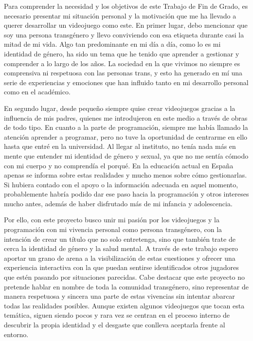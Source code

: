 
Para comprender la necesidad y los objetivos de este Trabajo de Fin de Grado, es necesario presentar mi situación personal y la motivación que me ha llevado a querer desarrollar un videojuego como este. En primer lugar, debo mencionar que soy una persona transgénero y llevo conviviendo con esa etiqueta durante casi la mitad de mi vida. Algo tan predominante en mi día a día, como lo es mi identidad de género, ha sido un tema que he tenido que aprender a gestionar y comprender a lo largo de los años. La sociedad en la que vivimos no siempre es comprensiva ni respetuosa con las personas trans, y esto ha generado en mí una serie de experiencias y emociones que han influido tanto en mi desarrollo personal como en el académico.

En segundo lugar, desde pequeño siempre quise crear videojuegos gracias a la influencia de mis padres, quienes me introdujeron en este medio a través de obras de todo tipo. En cuanto a la parte de programación, siempre me había llamado la atención aprender a programar, pero no tuve la oportunidad de centrarme en ello hasta que entré en la universidad. Al llegar al instituto, no tenía nada más en mente que entender mi identidad de género y sexual, ya que no me sentía cómodo con mi cuerpo y no comprendía el porqué. En la educación actual en España apenas se informa sobre estas realidades y mucho menos sobre cómo gestionarlas. Si hubiera contado con el apoyo o la información adecuada en aquel momento, probablemente habría podido dar ese paso hacia la programación y otros intereses mucho antes, además de haber disfrutado más de mi infancia y adolescencia.

Por ello, con este proyecto busco unir mi pasión por los videojuegos y la programación con mi vivencia personal como persona transgénero, con la intención de crear un título que no solo entretenga, sino que también trate de cerca la identidad de género y la salud mental. A través de este trabajo espero aportar un grano de arena a la visibilización de estas cuestiones y ofrecer una experiencia interactiva con la que puedan sentirse identificados otros jugadores que estén pasando por situaciones parecidas. Cabe destacar que este proyecto no pretende hablar en nombre de toda la comunidad transgénero, sino representar de manera respetuosa y sincera una parte de estas vivencias sin intentar abarcar todas las realidades posibles. Aunque existen algunos videojuegos que tocan esta temática, siguen siendo pocos y rara vez se centran en el proceso interno de descubrir la propia identidad y el desgaste que conlleva aceptarla frente al entorno.

